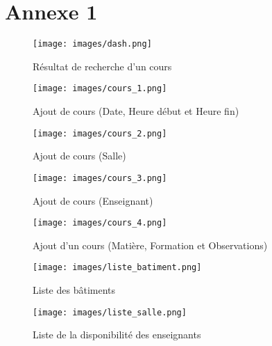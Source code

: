 \chapter{Annexe 1}
\begin{figure}[H]
\begin{center}
	\texttt{[image: images/dash.png]}
	\caption{Résultat de recherche d'un cours}
\end{center}
\end{figure}

\begin{figure}[H]
\begin{center}
	\texttt{[image: images/cours\_1.png]}
	\caption{Ajout de cours (Date, Heure début et Heure fin)}
\end{center}
\end{figure}

\begin{figure}[H]
\begin{center}
	\texttt{[image: images/cours\_2.png]}
	\caption{Ajout de cours (Salle)}
\end{center}
\end{figure}

\begin{figure}[H]
\begin{center}
	\texttt{[image: images/cours\_3.png]}
	\caption{Ajout de cours (Enseignant)}
\end{center}
\end{figure}

\begin{figure}[H]
\begin{center}
	\texttt{[image: images/cours\_4.png]}
	\caption{Ajout d'un cours (Matière, Formation et Observations)}
\end{center}
\end{figure}

\begin{figure}[H]
\begin{center}
	\texttt{[image: images/liste\_batiment.png]}
	\caption{Liste des bâtiments}
\end{center}
\end{figure}

\begin{figure}[H]
\begin{center}
	\texttt{[image: images/liste\_salle.png]}
	\caption{Liste de la disponibilité des enseignants}
\end{center}
\end{figure}


